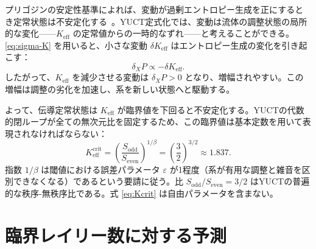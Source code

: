 \documentclass[12pt,a4paper]{article}
\begin{document}
	プリゴジンの安定性基準によれば、変動が過剰エントロピー生成を正にするとき定常状態は不安定化する~\cite{Glansdorff1971}。YUCT定式化では、変動は流体の調整状態の局所的な変化——\(K_{\mathrm{eff}}\) の定常値からの一時的なずれ——と考えることができる。\eqref{eq:sigma-K} を用いると、小さな変動 \(\delta K_{\mathrm{eff}}\) はエントロピー生成の変化を引き起こす：
	\begin{equation}
		\delta_X P \propto - \delta K_{\mathrm{eff}}.
	\end{equation}
	したがって、\(K_{\mathrm{eff}}\) を減少させる変動は \(\delta_X P > 0\) となり、増幅されやすい。この増幅は調整の劣化を加速し、系を新しい状態へと駆動する。
	
	よって、伝導定常状態は \(K_{\mathrm{eff}}\) が臨界値を下回ると不安定化する。YUCTの代数的閉ループが全ての無次元比を固定するため、この臨界値は基本定数を用いて表現されなければならない：
	\begin{equation}\label{eq:Kcrit}
		K_{\mathrm{eff}}^{\mathrm{crit}} = \left( \frac{S_{\mathrm{odd}}}{S_{\mathrm{even}}} \right)^{1/\beta}
		= \left( \frac{3}{2} \right)^{3/2} \approx 1.837.
	\end{equation}
	指数 \(1/\beta\) は閾値における誤差パラメータ \(\varepsilon\) が1程度（系が有用な調整と雑音を区別できなくなる）であるという要請に従う。比 \(S_{\mathrm{odd}}/S_{\mathrm{even}} = 3/2\) はYUCTの普遍的な秩序-無秩序比である。式 \eqref{eq:Kcrit} は自由パラメータを含まない。
	
	\section{臨界レイリー数に対する予測}
	
\end{document}
